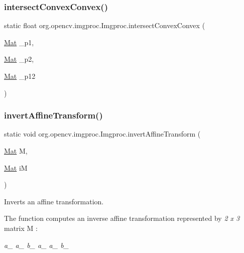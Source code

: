 \subsubsection{\texorpdfstring{intersect\+Convex\+Convex()}{intersectConvexConvex()}\hspace{0.1cm}{\footnotesize\ttfamily [2/2]}}
{\footnotesize\ttfamily static float org.\+opencv.\+imgproc.\+Imgproc.\+intersect\+Convex\+Convex (\begin{DoxyParamCaption}\item[{\mbox{\hyperlink{classorg_1_1opencv_1_1core_1_1_mat}{Mat}}}]{\+\_\+p1,  }\item[{\mbox{\hyperlink{classorg_1_1opencv_1_1core_1_1_mat}{Mat}}}]{\+\_\+p2,  }\item[{\mbox{\hyperlink{classorg_1_1opencv_1_1core_1_1_mat}{Mat}}}]{\+\_\+p12 }\end{DoxyParamCaption})\hspace{0.3cm}{\ttfamily [static]}}

\mbox{\label{classorg_1_1opencv_1_1imgproc_1_1_imgproc_aacadce25fcade314666c72930c0af3d1}} 
\subsubsection{\texorpdfstring{invert\+Affine\+Transform()}{invertAffineTransform()}}
{\footnotesize\ttfamily static void org.\+opencv.\+imgproc.\+Imgproc.\+invert\+Affine\+Transform (\begin{DoxyParamCaption}\item[{\mbox{\hyperlink{classorg_1_1opencv_1_1core_1_1_mat}{Mat}}}]{M,  }\item[{\mbox{\hyperlink{classorg_1_1opencv_1_1core_1_1_mat}{Mat}}}]{iM }\end{DoxyParamCaption})\hspace{0.3cm}{\ttfamily [static]}}

Inverts an affine transformation.

The function computes an inverse affine transformation represented by {\itshape 2 x 3} matrix {\ttfamily M} \+:

{\itshape a\+\_ a\+\_ b\+\_ a\+\_ a\+\_ b\+\_ }

